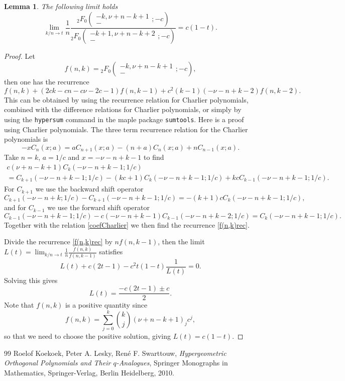\documentclass[10pt,a4paper]{amsart}
\newtheorem{lemma}{Lemma}
\begin{document}
\begin{lemma}
The following limit holds
\[    \lim_{k/n \to t}   \frac{1}{n}  \frac{{}_2F_0\left( \begin{array}{c}   -k, \nu+n-k+1 \\  - \end{array}; -c  \right)}
                                                               { {}_2F_0\left( \begin{array}{c}   -k+1, \nu+n-k+2 \\  - \end{array}; -c  \right)}  = c (1-t).    \]
\end{lemma}

\begin{proof}
Let
\[   f(n,k) =  {}_2F_0\left( \begin{array}{c}   -k, \nu+n-k+1 \\  - \end{array}; -c  \right), \]
then one has the recurrence
\begin{equation}   \label{f(n,k)rec}
    f(n,k) + (2ck-cn-c\nu-2c-1) f(n,k-1) + c^2(k-1)(-\nu-n+k-2) f(n,k-2).  
\end{equation}
This can be obtained by using the recurrence relation for Charlier polynomials, combined with the difference relations for Charlier polynomials,
or simply by using the \texttt{hypersum} command in the maple package \texttt{sumtools}. Here is a proof using Charlier polynomials.
The three term recurrence relation for the Charlier polynomials is \cite[Eq (9.14.3) on p.~247]{koekoek}
\begin{equation}  \label{Charlier3TR}
  -x C_n(x;a) = a C_{n+1}(x;a) - (n+a) C_n(x;a) + n C_{n-1}(x;a).   
\end{equation}
Take $n=k$, $a=1/c$ and $x=-\nu-n+k-1$ to find
\begin{multline*}  c(\nu+n-k+1) C_k(-\nu-n+k-1;1/c) \\
= C_{k+1}(-\nu-n+k-1;1/c) - (kc+1) C_k(-\nu-n+k-1;1/c) + kc C_{k-1}(-\nu-n+k-1;1/c). 
\end{multline*}
For  $C_{k+1}$ we use the backward shift operator \cite[Eq. (9.14.8) on p.~248]{koekoek} 
\[      C_{k+1}(-\nu-n+k;1/c) - C_{k+1}(-\nu-n+k-1;1/c) = -(k+1) c C_k(-\nu-n+k-1;1/c),  \]
and for $C_{k-1}$ we use the forward shift operator \cite[Eq. (9.14.6) on p.~248]{koekoek} 
\[     C_{k-1}(-\nu-n+k-1;1/c) - c(-\nu-n+k-1) C_{k-1}(-\nu-n+k-2;1/c) = C_k(-\nu-n+k-1;1/c).  \]
Together with the relation \eqref{coefCharlier} we then find the recurrence \eqref{f(n,k)rec}.

Divide the recurrence \eqref{f(n,k)rec} by $n f(n,k-1)$, then the limit $L(t) = \lim_{k/n \to t} \frac{1}{n} \frac{f(n,k)}{f(n,k-1)}$ satisfies
\[  L(t) + c(2t-1) - c^2t(1-t) \frac{1}{L(t)} = 0.  \]
Solving this gives
\[   L(t) = \frac{-c(2t-1) \pm c}{2}.  \]
Note that $f(n,k)$ is a positive quantity since
\[     f(n,k) = \sum_{j=0}^k \binom{k}{j} (\nu+n-k+1)_j c^j, \]
so that we need to choose the positive solution, giving $L(t) = c(1-t)$.
\end{proof}

\begin{thebibliography}{99}
 Roelof Koekoek, Peter A. Lesky, Ren\'e F. Swarttouw, \textit{Hypergeometric Orthogonal Polynomials and Their $q$-Analogues}, Springer Monographs in Mathematics, Springer-Verlag, Berlin Heidelberg, 2010.
\end{thebibliography}
\end{document}
